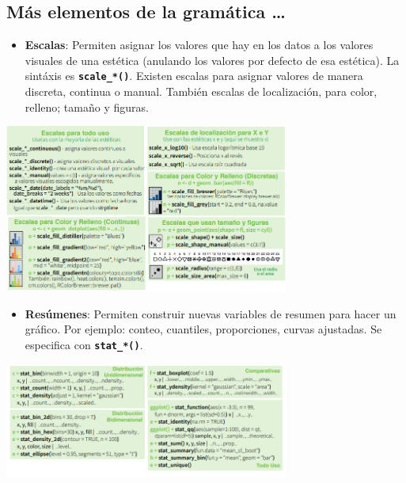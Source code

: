 \documentclass[
  letterpaper,
  DIV=11,
  numbers=noendperiod]{scrreprt}
\providecommand{\tightlist}{%
  \setlength{\itemsep}{0pt}\setlength{\parskip}{0pt}}\usepackage{longtable,booktabs,array}
\begin{document}
\subsection{Más elementos de la gramática
\ldots{}}\label{muxe1s-elementos-de-la-gramuxe1tica}

\begin{itemize}
\tightlist
\item
  \textbf{Escalas}: Permiten asignar los valores que hay en los datos a
  los valores visuales de una estética (anulando los valores por defecto
  de esa estética). La sintáxis es \textbf{\texttt{scale\_*()}}. Existen
  escalas para asignar valores de manera discreta, continua o manual.
  También escalas de localización, para color, relleno; tamaño y
  figuras.
\end{itemize}

\begin{center}
\includegraphics[width=0.7\textwidth,height=0.6\textheight]{Figuras/escalas.png}
\end{center}

\begin{itemize}
\tightlist
\item
  \textbf{Resúmenes}: Permiten construir nuevas variables de resumen
  para hacer un gráfico. Por ejemplo: conteo, cuantiles, proporciones,
  curvas ajustadas. Se especifica con \textbf{\texttt{stat\_*()}}.
\end{itemize}

\begin{center}
\includegraphics[width=0.7\textwidth,height=0.6\textheight]{Figuras/stats.png}
\end{center}
\end{document}
